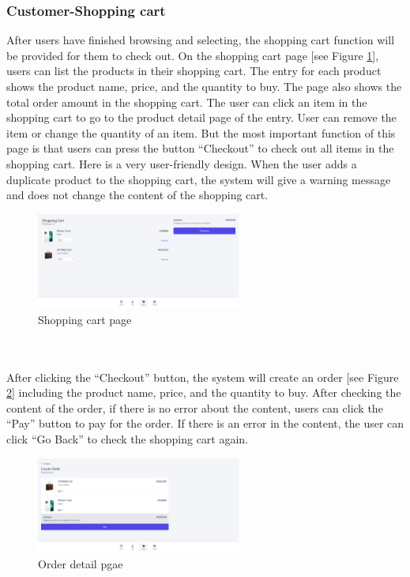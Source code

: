 \documentclass{article}
\begin{document}
\subsubsection{Customer-Shopping cart}
After users have finished browsing and selecting, the shopping cart function will be provided for them to check out. On the shopping cart page [see Figure \ref{fig:shopping cart page}], users can list the products in their shopping cart. The entry for each product shows the product name, price, and the quantity to buy. The page also shows the total order amount in the shopping cart. The user can click an item in the shopping cart to go to the product detail page of the entry. User can remove the item or change the quantity of an item. But the most important function of this page is that users can press the button “Checkout” to check out all items in the shopping cart. Here is a very user-friendly design. When the user adds a duplicate product to the shopping cart, the system will give a warning message and does not change the content of the shopping cart.
\begin{figure}[!htp]
    \centering
    \includegraphics[width=0.6\textwidth]{shopping cart page.png}
    \caption{\label{fig:shopping cart page} Shopping cart page}
\end{figure}
\\\\
After clicking the “Checkout” button, the system will create an order [see Figure \ref{fig:order detail page}] including the product name, price, and the quantity to buy. After checking the content of the order, if there is no error about the content, users can click the “Pay” button to pay for the order. If there is an error in the content, the user can click “Go Back” to check the shopping cart again.
\begin{figure}[!htp]
    \centering
    \includegraphics[width=0.6\textwidth]{order detail page.png}
    \caption{\label{fig:order detail page}Order detail pgae}
\end{figure}
\end{document}
